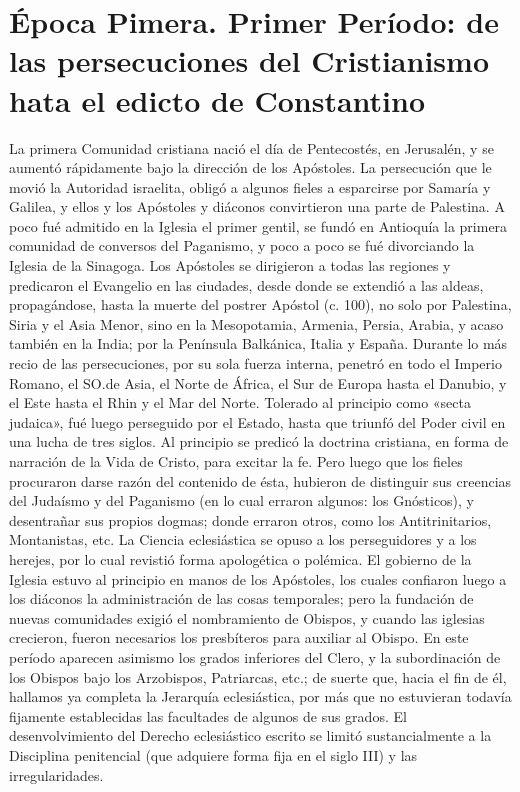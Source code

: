\raggedbottom{} \documentclass[12pt, a4paper, openany]{book} %
\begin{document}
\part{Época Pimera. Primer Período: de las persecuciones del Cristianismo hata el edicto de Constantino}
La primera Comunidad cristiana nació el día de Pentecostés, en Jerusalén, y se aumentó rápidamente bajo la dirección de los Apóstoles. La persecución que le movió la Autoridad israelita, obligó a algunos fieles a esparcirse por Samaría y Galilea, y ellos y los Apóstoles y diáconos convirtieron una parte de Palestina. A poco fué admitido en la Iglesia el primer gentil, se fundó en Antioquía la primera comunidad de conversos del Paganismo, y poco a poco se fué divorciando la Iglesia de la Sinagoga. Los Apóstoles se dirigieron a todas las regiones y predicaron el Evangelio en las ciudades, desde donde se extendió a las aldeas, propagándose, hasta la muerte del postrer Apóstol (c. 100), no solo por Palestina, Siria y el Asia Menor, sino en la Mesopotamia, Armenia, Persia, Arabia, y acaso también en la India; por la Península Balkánica, Italia y España. Durante lo más recio de las persecuciones, por su sola fuerza interna, penetró en todo el Imperio Romano, el SO.\@ de Asia, el Norte de África, el Sur de Europa hasta el Danubio, y el Este hasta el Rhin y el Mar del Norte. Tolerado al principio como «secta judaica», fué luego perseguido por el Estado, hasta que triunfó del Poder civil en una lucha de tres siglos. Al principio se predicó la doctrina cristiana, en forma de narración de la Vida de Cristo, para excitar la fe. Pero luego que los fieles procuraron darse razón del contenido de ésta, hubieron de distinguir sus creencias del Judaísmo y del Paganismo (en lo cual erraron algunos: los Gnósticos), y desentrañar sus propios dogmas; donde erraron otros, como los Antitrinitarios, Montanistas, etc. La Ciencia eclesiástica se opuso a los perseguidores y a los herejes, por lo cual revistió forma apologética o polémica. El gobierno de la Iglesia estuvo al principio en manos de los Apóstoles, los cuales confiaron luego a los diáconos la administración de las cosas temporales; pero la fundación de nuevas comunidades exigió el nombramiento de Obispos, y cuando las iglesias crecieron, fueron necesarios los presbíteros para auxiliar al Obispo. En este período aparecen asimismo los grados inferiores del Clero, y la subordinación de los Obispos bajo los Arzobispos, Patriarcas, etc.; de suerte que, hacia el fin de él, hallamos ya completa la Jerarquía eclesiástica, por más que no estuvieran todavía fijamente establecidas las facultades de algunos de sus grados. El desenvolvimiento del Derecho eclesiástico escrito se limitó sustancialmente a la Disciplina penitencial (que adquiere forma fija en el siglo III) y las irregularidades.
\end{document}

